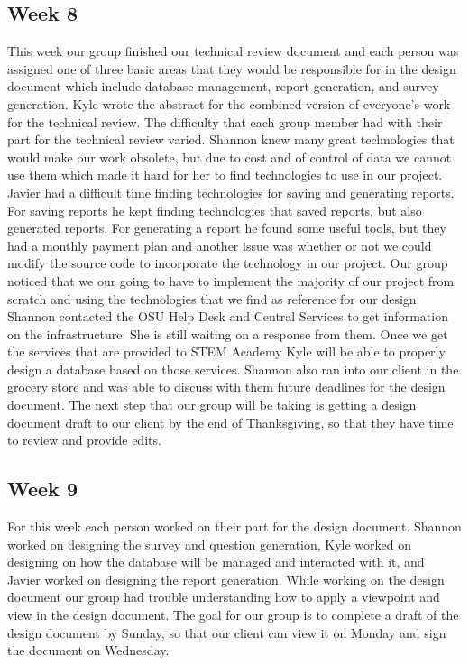 \documentclass[letterpaper,10pt,serif, draftclsnofoot,onecolumn, compsoc, titlepage]{IEEEtran}
\begin{document}
\subsection{Week 8} 

This week our group finished our technical review document and each person was assigned one of three basic areas that they would be responsible for in the design document which include database management, report generation, and survey generation. Kyle wrote the abstract for the combined version of everyone's work for the technical review. The difficulty that each group member had with their part for the technical review varied. Shannon knew many great technologies that would make our work obsolete, but due to cost and of control of data we cannot use them which made it hard for her to find technologies to use in our project. Javier had a difficult time finding technologies for saving and generating reports. For saving reports he kept finding technologies that saved reports, but also generated reports. For generating a report he found some useful tools, but they had a monthly payment plan and another issue was whether or not we could modify the source code to incorporate the technology in our project. Our group noticed that we our going to have to implement the majority of our project from scratch and using the technologies that we find as reference for our design. Shannon contacted the OSU Help Desk and Central Services to get information on the infrastructure. She is still waiting on a response from them. Once we get the services that are provided to STEM Academy Kyle will be able to properly design a database based on those services. Shannon also ran into our client in the grocery store and was able to discuss with them future deadlines for the design document.  The next step that our group will be taking is getting a design document draft to our client by the end of Thanksgiving, so that they have time to review and provide edits. 

\subsection{Week 9}
For this week each person worked on their part for the design document. Shannon worked on designing the survey and question generation, Kyle worked on designing on how the database will be managed and interacted with it, and Javier worked on designing the report generation. While working on the design document our group had trouble understanding how to apply a viewpoint and view in the design document. The goal for our group is to complete a draft of the design document by Sunday, so that our client can view it on Monday and sign the document on Wednesday. 
\end{document}

